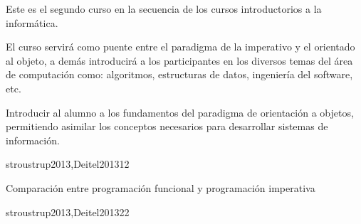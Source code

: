 
\begin{syllabus}


\begin{justification}
Este es el segundo curso en la secuencia de los cursos introductorios a la informática.

El curso servirá como puente entre el paradigma de la imperativo y el orientado al objeto, a demás introducirá a los participantes en los diversos temas del área de computación como: algoritmos, estructuras de datos, ingeniería del software, etc.
\end{justification}

\begin{goals}
\item Introducir al alumno a los fundamentos del paradigma de
      orientación a objetos, permitiendo asimilar los conceptos
      necesarios para desarrollar  sistemas de información.
\end{goals}

\begin{outcomes}
\end{outcomes}

\begin{unit}{\PLOverviewDef}{stroustrup2013,Deitel2013}{1}{2}
   \begin{topics}
      \item \PLOverviewTopicBrief
      \item Comparación entre programación funcional y programación imperativa
      \item \PLOverviewTopicHistory
   \end{topics}

   \begin{learningoutcomes}
      \item \PLOverviewObjONE
      \item \PLOverviewObjTWO
      \item \PLOverviewObjTHREE
   \end{learningoutcomes}
\end{unit}

\begin{unit}{\PLVirtualMachinesDef}{stroustrup2013,Deitel2013}{2}{2}
   \begin{topics}
      \item \PLVirtualMachinesTopicETheconcept%
      \item \PLVirtualMachinesTopicHierarchy%
      \item \PLVirtualMachinesTopicIntermediate%
   \end{topics}


\end{unit}
\end{syllabus}
